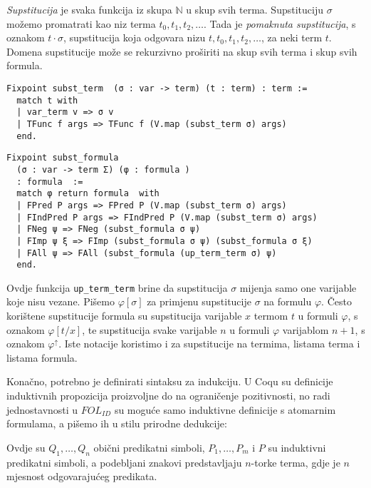\begin{definition}
  \textit{Supstitucija} je svaka funkcija iz skupa \(\mathbb{N}\) u skup svih terma.
  Supstituciju \(\sigma\) možemo promatrati kao niz terma \(t_{0}, t_{1}, t_{2}, \ldots\).
  Tada je \textit{pomaknuta supstitucija}, s oznakom \(t \cdot \sigma\), supstitucija koja odgovara nizu \(t, t_{0}, t_{1}, t_{2}, \ldots\), za neki term \(t\).\\
  \noindent Domena supstitucije može se rekurzivno proširiti na skup svih terma i skup svih formula.
\begin{verbatim}
Fixpoint subst_term  (σ : var -> term) (t : term) : term :=
  match t with
  | var_term v => σ v
  | TFunc f args => TFunc f (V.map (subst_term σ) args)
  end.
\end{verbatim}
\begin{verbatim}
Fixpoint subst_formula
  (σ : var -> term Σ) (φ : formula )
  : formula  :=
  match φ return formula  with
  | FPred P args => FPred P (V.map (subst_term σ) args)
  | FIndPred P args => FIndPred P (V.map (subst_term σ) args)
  | FNeg ψ => FNeg (subst_formula σ ψ)
  | FImp ψ ξ => FImp (subst_formula σ ψ) (subst_formula σ ξ)
  | FAll ψ => FAll (subst_formula (up_term_term σ) ψ)
  end.
\end{verbatim}
  \noindent Ovdje funkcija \texttt{up\_term\_term} brine da supstitucija \(\sigma\) mijenja samo one varijable koje nisu vezane.
  \noindent Pišemo \(\varphi[\sigma]\) za primjenu supstitucije \(\sigma\) na formulu \(\varphi\).
  Često korištene supstitucije formula su
  supstitucija varijable \(x\) termom \(t\) u formuli \(\varphi\), s oznakom \(\varphi[t/x]\),
  te supstitucija svake varijable \(n\) u formuli \(\varphi\) varijablom \(n + 1\), s oznakom \(\varphi^{\uparrow}\).
  Iste notacije koristimo i za supstitucije na termima, listama terma i listama formula.
\end{definition}

Konačno, potrebno je definirati sintaksu za indukciju.
U Coqu su definicije induktivnih propozicija proizvoljne do na ograničenje pozitivnosti,
no radi jednostavnosti u \(\mathit{FOL_{ID}}\) su moguće samo
induktivne definicije s atomarnim formulama, a pišemo ih u stilu prirodne dedukcije:
\begin{prooftree}
\end{prooftree}
\noindent Ovdje su \(Q_{1}, \ldots, Q_{n}\) obični predikatni simboli, \(P_{1}, \ldots, P_{m}\) i \(P\) su induktivni predikatni simboli,
a podebljani znakovi predstavljaju \(n\)-torke terma, gdje je \(n\) mjesnost odgovarajućeg predikata.


